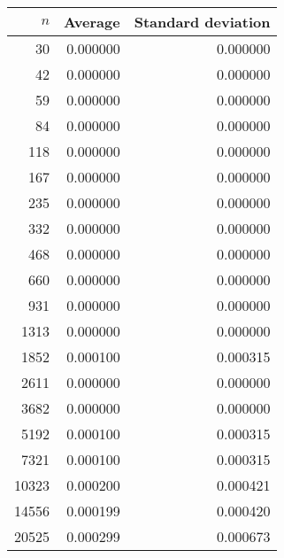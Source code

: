 \begin {tabular}{rrr}
$n$ & Average & Standard deviation\\ \hline 
30 & 0.000000 & 0.000000\\ 
42 & 0.000000 & 0.000000\\ 
59 & 0.000000 & 0.000000\\ 
84 & 0.000000 & 0.000000\\ 
118 & 0.000000 & 0.000000\\ 
167 & 0.000000 & 0.000000\\ 
235 & 0.000000 & 0.000000\\ 
332 & 0.000000 & 0.000000\\ 
468 & 0.000000 & 0.000000\\ 
660 & 0.000000 & 0.000000\\ 
931 & 0.000000 & 0.000000\\ 
1313 & 0.000000 & 0.000000\\ 
1852 & 0.000100 & 0.000315\\ 
2611 & 0.000000 & 0.000000\\ 
3682 & 0.000000 & 0.000000\\ 
5192 & 0.000100 & 0.000315\\ 
7321 & 0.000100 & 0.000315\\ 
10323 & 0.000200 & 0.000421\\ 
14556 & 0.000199 & 0.000420\\ 
20525 & 0.000299 & 0.000673\\ 
\end{tabular}
